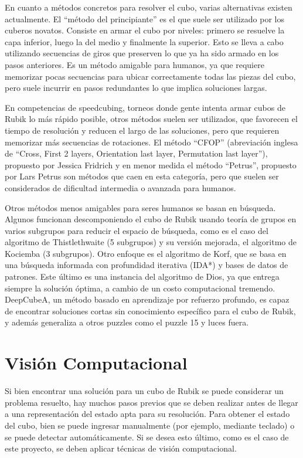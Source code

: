 En cuanto a métodos concretos para resolver el cubo, varias alternativas existen actualmente. El ``método del principiante''\cite{beginner} es el que suele ser utilizado por los cuberos novatos. Consiste en armar el cubo por niveles: primero se resuelve la capa inferior, luego la del medio y finalmente la superior. Esto se lleva a cabo utilizando secuencias de giros que preserven lo que ya ha sido armado en los pasos anteriores. Es un método amigable para humanos, ya que requiere memorizar pocas secuencias para ubicar correctamente todas las piezas del cubo, pero suele incurrir en pasos redundantes lo que implica soluciones largas.

En competencias de speedcubing, torneos donde gente intenta armar cubos de Rubik lo más rápido posible, otros métodos suelen ser utilizados, que favorecen el tiempo de resolución y reducen el largo de las soluciones, pero que requieren memorizar más secuencias de rotaciones. El método ``CFOP'' (abreviación inglesa de ``Cross, First 2 layers, Orientation last layer, Permutation last layer''), propuesto por Jessica Fridrich\cite{fridrich} y en menor medida el método ``Petrus'', propuesto por Lars Petrus\cite{petrus} son métodos que caen en esta categoría, pero que suelen ser considerados de dificultad intermedia o avanzada para humanos.

Otros métodos menos amigables para seres humanos se basan en búsqueda. Algunos funcionan descomponiendo el cubo de Rubik usando teoría de grupos en varios subgrupos para reducir el espacio de búsqueda, como es el caso del algoritmo de Thistlethwaite\cite{thistlethwaite} (5 subgrupos) y su versión mejorada, el algoritmo de Kociemba\cite{kociemba} (3 subgrupos). Otro enfoque es el algoritmo de Korf\cite{korf}, que se basa en una búsqueda informada con profundidad iterativa (IDA*)\cite{ida} y bases de datos de patrones\cite{patterndatabases}. Este último es una instancia del algoritmo de Dios, ya que entrega siempre la solución óptima, a cambio de un costo computacional tremendo\cite{korfcomplexity}. DeepCubeA\cite{deepcube}, un método basado en aprendizaje por refuerzo profundo, es capaz de encontrar soluciones cortas sin conocimiento específico para el cubo de Rubik, y además generaliza a otros puzzles como el puzzle 15 y luces fuera.


\section*{Visión Computacional}
Si bien encontrar una solución para un cubo de Rubik se puede considerar un problema resuelto, hay muchos pasos previos que se deben realizar antes de llegar a una representación del estado apta para su resolución. Para obtener el estado del cubo, bien se puede ingresar manualmente (por ejemplo, mediante teclado) o se puede detectar automáticamente. Si se desea esto último, como es el caso de este proyecto, se deben aplicar técnicas de visión computacional.

